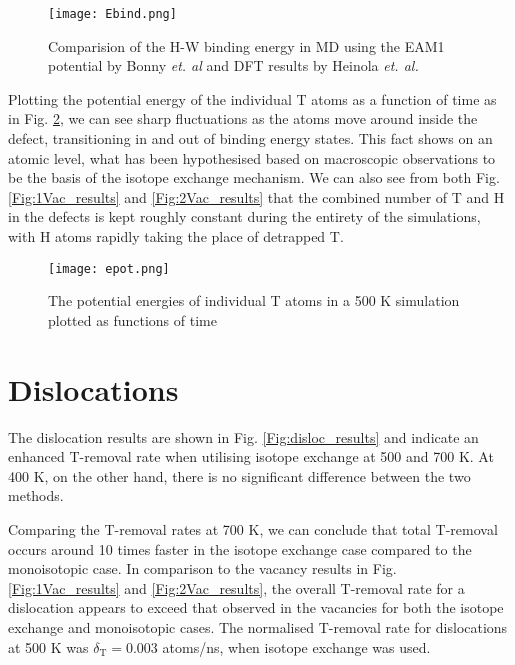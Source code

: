 \begin{figure}[!ht]
	\center
	\texttt{[image: Ebind.png]}
	\caption{Comparision of the H-W binding energy in MD using the EAM1 potential by Bonny \textit{et. al} and DFT results by Heinola \textit{et. al. }\cite{heinolaTungstenDFT}}
	\label{Fig:Ebind1H_DFT}
\end{figure}

Plotting the potential energy of the individual T atoms as a function of time as in Fig. \ref{Fig:Epot}, we can see sharp fluctuations as the atoms move around inside the defect, transitioning in and out of binding energy states.
This fact shows on an atomic level, what has been hypothesised based on macroscopic observations to be the basis of the isotope exchange mechanism.
We can also see from both Fig. \ref{Fig:1Vac_results} and \ref{Fig:2Vac_results} that the combined number of T and H in the defects is kept roughly constant during the entirety of the simulations, with H atoms rapidly taking the place of detrapped T.

\begin{figure}[!ht]
	\center
	\texttt{[image: epot.png]}
	\caption{The potential energies of individual T atoms in a 500 K simulation plotted as functions of time\vspace*{6mm}}
	\label{Fig:Epot}
\end{figure}


\section{Dislocations}
The dislocation results are shown in Fig. \ref{Fig:disloc_results} and indicate an enhanced T-removal rate when utilising isotope exchange at 500 and 700 K. 
At 400 K, on the other hand, there is no significant difference between the two methods.

Comparing the T-removal rates at 700 K, we can conclude that total T-removal occurs around 10 times faster in the isotope exchange case compared to the monoisotopic case.
In comparison to the vacancy results in Fig. \ref{Fig:1Vac_results} and \ref{Fig:2Vac_results}, the overall T-removal rate for a dislocation appears to exceed that observed in the vacancies for both the isotope exchange and monoisotopic cases.
The normalised T-removal rate for dislocations at 500 K was $\delta_{\text{T}} = 0.003$ atoms/ns, when isotope exchange was used.

